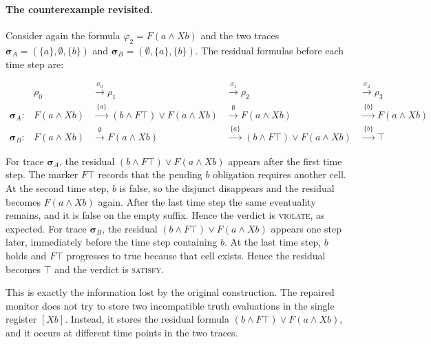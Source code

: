 \paragraph{The counterexample revisited.}
Consider again the formula $\varphi_2 = F(a\land Xb)$ and the two traces $\boldsymbol{\sigma}_A = (\{a\}, \emptyset, \{b\})$ and $\boldsymbol{\sigma}_B = (\emptyset, \{a\}, \{b\})$. The residual formulas before each time step are:

\[
\begin{array}{lllll}
 & \rho_0 & \xrightarrow{\ \sigma_0\ } \rho_1 & \xrightarrow{\ \sigma_1\ } \rho_2 & \xrightarrow{\ \sigma_2\ } \rho_3 \\[0.5ex]
\boldsymbol{\sigma}_A: & F(a \land Xb) & \xrightarrow{\ \{a\}\ } (b\land F\top) \lor F(a \land Xb) & \xrightarrow{\ \emptyset\ } F(a \land Xb) & \xrightarrow{\ \{b\}\ } F(a \land Xb) \\
\boldsymbol{\sigma}_B: & F(a \land Xb) & \xrightarrow{\ \emptyset\ } F(a \land Xb) & \xrightarrow{\ \{a\}\ } (b\land F\top) \lor F(a \land Xb) & \xrightarrow{\ \{b\}\ } \top
\end{array}
\]

\noindent
For trace $\boldsymbol{\sigma}_A$, the residual $(b\land F\top)\lor F(a \land Xb)$ appears after the first time step. The marker $F\top$ records that the pending $b$ obligation requires another cell. At the second time step, $b$ is false, so the disjunct disappears and the residual becomes $F(a \land Xb)$ again. After the last time step the same eventuality remains, and it is false on the empty suffix. Hence the verdict is \textsc{violate}, as expected.
%
For trace $\boldsymbol{\sigma}_B$, the residual $(b\land F\top)\lor F(a \land Xb)$ appears one step later, immediately before the time step containing $b$. At the last time step, $b$ holds and $F\top$ progresses to true because that cell exists. Hence the residual becomes $\top$ and the verdict is \textsc{satisfy}.

This is exactly the information lost by the original construction. The repaired monitor does not try to store two incompatible truth evaluations in the single register $[Xb]$. Instead, it stores the residual formula $(b\land F\top)\lor F(a\land Xb)$, and it occurs at different time points in the two traces.

